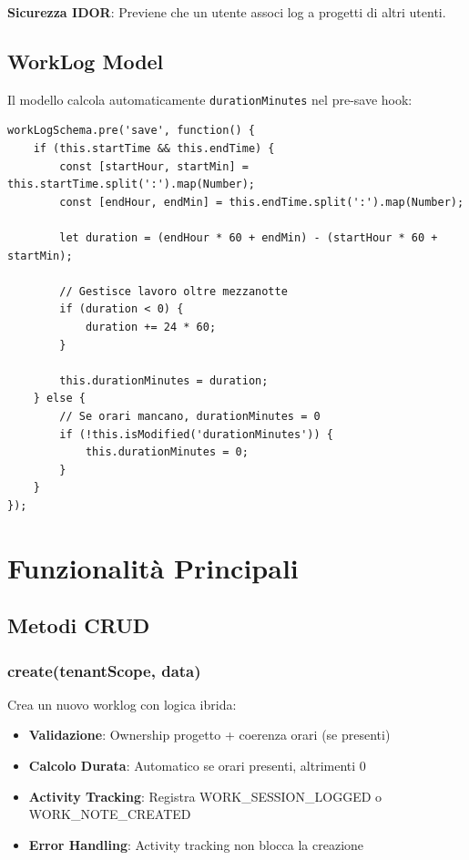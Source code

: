 \documentclass[11pt,a4paper]{article}
\begin{document}
\textbf{Sicurezza IDOR}: Previene che un utente associ log a progetti di altri utenti.

\subsection{WorkLog Model}

Il modello calcola automaticamente \texttt{durationMinutes} nel pre-save hook:

\begin{lstlisting}[caption=Pre-save Hook - Calcolo Durata]
workLogSchema.pre('save', function() {
    if (this.startTime && this.endTime) {
        const [startHour, startMin] = this.startTime.split(':').map(Number);
        const [endHour, endMin] = this.endTime.split(':').map(Number);
        
        let duration = (endHour * 60 + endMin) - (startHour * 60 + startMin);
        
        // Gestisce lavoro oltre mezzanotte
        if (duration < 0) {
            duration += 24 * 60;
        }
        
        this.durationMinutes = duration;
    } else {
        // Se orari mancano, durationMinutes = 0
        if (!this.isModified('durationMinutes')) {
            this.durationMinutes = 0;
        }
    }
});
\end{lstlisting}

\section{Funzionalità Principali}

\subsection{Metodi CRUD}

\subsubsection{create(tenantScope, data)}

Crea un nuovo worklog con logica ibrida:

\begin{itemize}
    \item \textbf{Validazione}: Ownership progetto + coerenza orari (se presenti)
    \item \textbf{Calcolo Durata}: Automatico se orari presenti, altrimenti 0
    \item \textbf{Activity Tracking}: Registra WORK\_SESSION\_LOGGED o WORK\_NOTE\_CREATED
    \item \textbf{Error Handling}: Activity tracking non blocca la creazione
\end{itemize}
\end{document}
